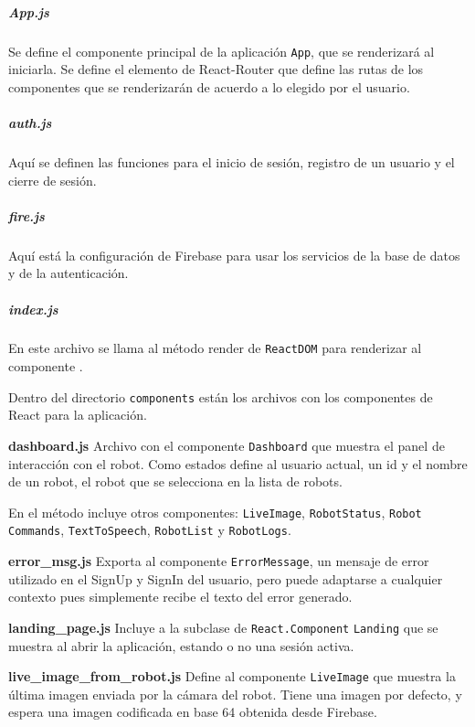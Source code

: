 \subparagraph{App.js}
\label{\detokenize{code_docs:app-js}}
Se define el componente principal de la aplicación \texttt{App}, que se renderizará
al iniciarla. Se define el elemento  de React-Router
que define las rutas de los componentes que se renderizarán de acuerdo a lo
elegido por el usuario.


\subparagraph{auth.js}
\label{\detokenize{code_docs:auth-js}}
Aquí se definen las funciones para el inicio de sesión, registro de un usuario
y el cierre de sesión.


\subparagraph{fire.js}
\label{\detokenize{code_docs:fire-js}}
Aquí está la configuración de Firebase para usar los servicios de la base de datos
y de la autenticación.



\subparagraph{index.js}
\label{\detokenize{code_docs:index-js}}
En este archivo se llama al método render de \texttt{ReactDOM} para renderizar al
componente .


Dentro del directorio \texttt{components} están los archivos con los componentes de React para la aplicación.

\textbf{dashboard.js}
\label{\detokenize{code_docs:dashboard-js}}
Archivo con el componente \texttt{Dashboard} que muestra el panel de interacción con el robot.
Como estados define al usuario actual, un id y el nombre de un robot, el robot
que se selecciona en la lista de robots.

En el método  incluye otros componentes:
\texttt{LiveImage},
\texttt{RobotStatus},
\texttt{Robot\\Commands},
\texttt{TextToSpeech},
\texttt{RobotList} y
\texttt{RobotLogs}.


\textbf{error\_msg.js}
\label{\detokenize{code_docs:error-msg-js}}
Exporta al componente \texttt{ErrorMessage}, un mensaje de error utilizado en el SignUp y SignIn del usuario, pero puede
adaptarse a cualquier contexto pues simplemente recibe el texto del error
generado.

\textbf{landing\_page.js}
\label{\detokenize{code_docs:landing-page-js}}
Incluye a la subclase de \texttt{React.Component} \texttt{Landing} que se muestra al abrir la aplicación, estando o no una sesión
activa.


\textbf{live\_image\_from\_robot.js}
\label{\detokenize{code_docs:live-image-from-robot-js}}
Define al componente \texttt{LiveImage} que muestra la última imagen enviada por la cámara del robot. Tiene una imagen por
defecto, y espera una imagen codificada en base 64 obtenida desde Firebase.



